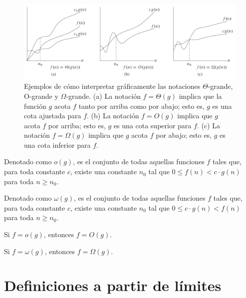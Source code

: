 \begin{figure}[H]
    \begin{centering}
        \includegraphics[width=1\textwidth]{figuras/big-o}
    \par\end{centering}
    \caption{{\small{}Ejemplos de cómo interpretar gráficamente las notaciones
    $\Theta$-grande, O-grande y $\Omega$-grande. (a) La notación $f=\Theta(g)$
    implica que la función $g$ acota $f$ tanto por arriba como por abajo;
    esto es, $g$ es una cota ajustada para $f$. (b) La notación $f=O(g)$
    implica que $g$ acota $f$ por arriba; esto es, $g$ es una cota
    superior para $f$. (c) La notación $f=\Omega(g)$ implica que $g$
    acota $f$ por abajo; esto es, $g$ es una cota inferior para $f$.}}
\end{figure}

\begin{defn}[o chica]
    Denotado como $o(g)$, es el conjunto de todas aquellas funciones
    $f$ tales que, para toda constante $c$, existe una constante $n_{0}$
    tal que $0\leq f(n)<c\cdot g(n)$ para toda $n\geq n_{0}$.
\end{defn}

\begin{defn}
    Denotado como $\omega(g)$, es el conjunto de todas aquellas funciones
    $f$ tales que, para toda constante $c$, existe una constante $n_{0}$
    tal que $0\leq c\cdot g(n)<f(n)$ para toda $n\geq n_{0}$.
\end{defn}

\begin{prop}
    Si $f=o(g)$, entonces $f=O(g)$.
\end{prop}

\begin{prop}
    Si $f=\omega(g)$, entonces $f=\Omega(g)$.
\end{prop}

\section{Definiciones a partir de límites}

